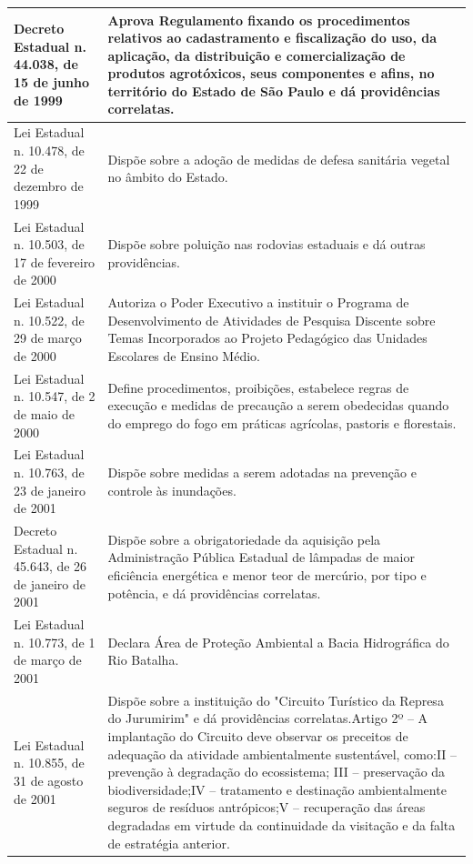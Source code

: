 \begin{center}
\begin{longtable}{|p{}|p{}|}
			\hline
			Decreto Estadual n. 44.038, de 15 de junho de 1999 & Aprova  Regulamento  fixando  os  procedimentos  relativos  ao  cadastramento  e fiscalização do uso, da aplicação, da distribuição e comercialização de produtos agrotóxicos, seus componentes e afins, no território do Estado de São Paulo e dá providências correlatas. \\
			\hline
			Lei  Estadual  n.  10.478,  de  22 de dezembro de 1999 & Dispõe  sobre  a  adoção  de  medidas  de  defesa  sanitária  vegetal  no  âmbito  do Estado. \\
			\hline
			Lei  Estadual  n.  10.503,  de  17 de fevereiro de 2000 & Dispõe sobre poluição nas rodovias estaduais e dá outras providências. \\
			\hline
			Lei  Estadual  n.  10.522,  de  29 de março de 2000 & Autoriza  o  Poder  Executivo  a  instituir  o  Programa  de  Desenvolvimento  de Atividades   de   Pesquisa   Discente   sobre   Temas   Incorporados   ao   Projeto Pedagógico das Unidades Escolares de Ensino Médio. \\
			\hline
			Lei Estadual n. 10.547, de 2 de maio de 2000 & Define procedimentos, proibições, estabelece regras de execução e medidas de precaução  a  serem  obedecidas  quando  do  emprego  do  fogo  em  práticas agrícolas, pastoris e florestais. \\
			\hline
			Lei  Estadual  n.  10.763,  de  23 de janeiro de 2001 & Dispõe   sobre   medidas   a   serem   adotadas   na   prevenção   e   controle   às inundações. \\
			\hline
			Decreto Estadual n. 45.643, de 26 de janeiro de 2001 & Dispõe   sobre   a   obrigatoriedade   da   aquisição   pela   Administração   Pública Estadual de lâmpadas de maior eficiência energética e menor teor de mercúrio, por tipo e potência, e dá providências correlatas. \\
			\hline
			Lei Estadual n. 10.773, de 1 de março de 2001 & Declara Área de Proteção Ambiental a Bacia Hidrográfica do Rio Batalha. \\
			\hline
			Lei  Estadual  n.  10.855,  de  31 de agosto de 2001 & Dispõe sobre a instituição do "Circuito Turístico da Represa do Jurumirim" e dá providências correlatas.\newline{}Artigo 2º – A implantação do Circuito deve observar os preceitos de adequação da atividade ambientalmente sustentável, como:\newline{}II – prevenção à degradação do ecossistema; III – preservação da biodiversidade;\newline{}IV – tratamento e destinação ambientalmente seguros de resíduos antrópicos;\newline{}V – recuperação das áreas degradadas em virtude da continuidade da visitação e da falta de estratégia anterior. \\

\end{longtable}
\end{center}
